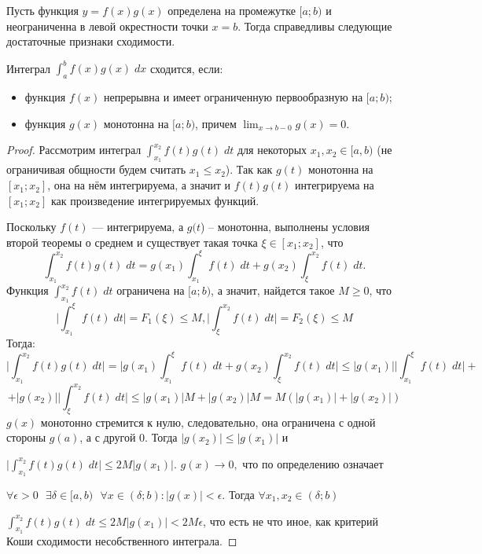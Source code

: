     Пусть функция $y = f(x)g(x)$ определена на промежутке $[a; b)$ и неограниченна в левой окрестности точки $x = b$. Тогда справедливы следующие достаточные признаки сходимости.
    
    \begin{theorem}
    	Интеграл $\int_a^b f(x)g(x) \; dx$ сходится, если:
    	\begin{itemize}
    		\item функция $f(x)$ непрерывна и имеет ограниченную первообразную на $[a; b)$;
    		\item функция $g(x)$ монотонна на $[a; b)$, причем $\displaystyle \lim_{x \to b - 0} {g(x)} = 0$.
    	\end{itemize}
    \end{theorem}
    
    \begin{proof}
    	Рассмотрим интеграл $\int_{x_1}^{x_2} f(t) g(t) \; dt$ для некоторых $x_1, x_2 \in [a, b)$ (не ограничивая общности будем считать $x_1 \leqslant x_2$). Так как $g(t)$ монотонна на $[x_1; x_2]$, она на нём интегрируема, а значит и $f(t)g(t)$ интегрируема на $[x_1; x_2]$ как произведение интегрируемых функций.
    	
    	Поскольку $f(t)$ — интегрируема, а $g(t$) – монотонна, выполнены условия второй теоремы о среднем и существует такая точка $\xi \in [x_1; x_2]$, что
    	\[ \int_{x_1}^{x_2} f(t)g(t) \; dt = g(x_1) \int_{x_1}^{\xi} f(t) \; dt + g(x_2) \int_{\xi}^{x_2} f(t) \; dt. \]
    	Функция $\int_{x_1}^{x_2} f(t) \; dt$ ограничена на $[a; b)$, а значит, найдется такое $M \geqslant 0$, что
    	\[ \bigg|\int_{x_1}^{\xi} f(t) \; dt\bigg| = F_1(\xi) \leqslant M, \bigg|\int_{\xi}^{x_2} f(t) \; dt\bigg| = F_2(\xi) \leqslant M \]
    	Тогда:
    	\[ \bigg|\int_{x_1}^{x_2} f(t) g(t) \; dt\bigg| = \bigg|g(x_1) \int_{x_1}^{\xi} f(t) \; dt + g(x_2) \int_{\xi}^{x_2} f(t) \; dt \bigg| \leqslant |g(x_1)| \bigg|\int_{x_1}^{\xi} f(t) \; dt\bigg| + \] 
    	\[ + |g(x_2)| \bigg|\int_{\xi}^{x_2} f(t) \; dt\bigg| \leqslant |g(x_1)| M + |g(x_2)| M = M (|g(x_1)| + |g(x_2)|) \]
    	$g(x)$ монотонно стремится к нулю, следовательно, она ограничена с одной стороны $g(a)$, а с другой 0. Тогда $|g(x_2)| \leqslant |g(x_1)|$ и
    	
    	$\displaystyle \bigg|\int_{x_1}^{x_2} f(t) g(t) \; dt\bigg| \leqslant 2M|g(x_1)|.$ $g(x) \to 0,$ что по определению означает
    	
    	$\forall \epsilon > 0 \text{ } \exists \delta \in [a, b) \text{ } \forall x \in (\delta; b): |g(x)| < \epsilon$. Тогда $\forall x_1, x_2 \in (\delta; b)$
    	
    	$\int_{x_1}^{x_2} f(t) g(t) \; dt \leqslant 2M|g(x_1)| < 2M\epsilon$, что есть не что иное, как критерий Коши сходимости несобственного интеграла.
    \end{proof}
    
